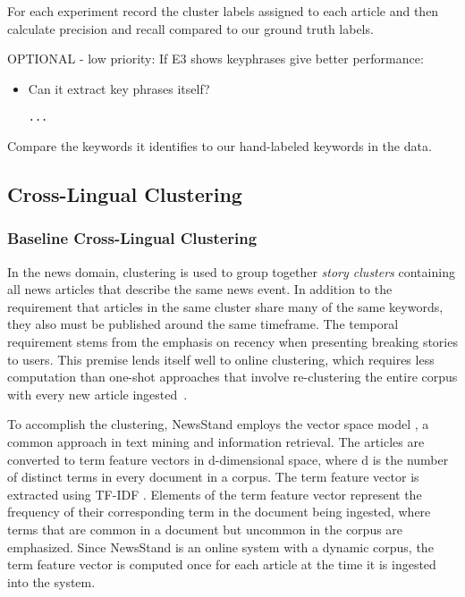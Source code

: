 For each experiment record the cluster labels assigned to each article and then calculate precision and recall compared to our ground truth labels.

OPTIONAL - low priority:
If E3 shows keyphrases give better performance:
\begin{itemize}
    \item Can it extract key phrases itself? 
    \begin{lstlisting}[title=Prompt 7: Keyphrase Extraction Prompt]
    ...
    \end{lstlisting}
\end{itemize}

Compare the keywords it identifies to our hand-labeled keywords in the data.

\subsection{Cross-Lingual Clustering}

\subsubsection{Baseline Cross-Lingual Clustering}
In the news domain, clustering is used to group together \emph{story clusters} containing all news articles that describe the same news event. In addition to the requirement that articles in the same cluster share many of the same keywords, they also must be published around the same timeframe. The temporal requirement stems from the emphasis on recency when presenting breaking stories to users. This premise lends itself well to online clustering, which requires less computation than one-shot approaches that involve re-clustering the entire corpus with every new article ingested~\cite{Teit08}.

To accomplish the clustering, NewsStand employs the vector space model \cite{salton}, a common approach in text mining and information retrieval. The articles are converted to term feature vectors in d-dimensional space, where d is the number of distinct terms in every document in a corpus. The term feature vector is extracted using TF-IDF \cite{salton-buckley}. Elements of the term feature vector represent the frequency of their corresponding term in the document being ingested, where terms that are common in a document but uncommon in the corpus are emphasized. Since NewsStand is an online system with a dynamic corpus, the term feature vector is computed once for each article at the time it is ingested into the system.

